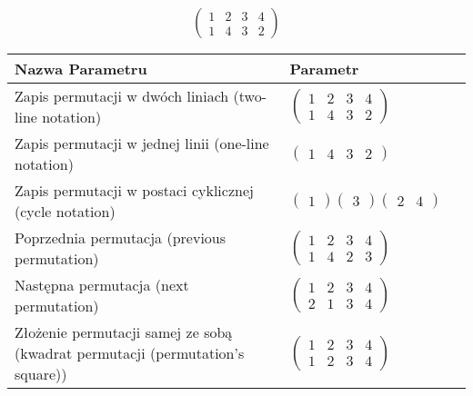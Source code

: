 \documentclass[12pt]{article}
\begin{document}
\subsection{}
\begin{center}
\[
\begin{pmatrix}
	1 & 2 & 3 & 4 \\ 
	1 & 4 & 3 & 2 
\end{pmatrix}
\]

\begin{tabular}{|m{0.6\linewidth}|m{0.4\linewidth}|}
	\hline
	Nazwa Parametru & Parametr \\
	\hline
	Zapis permutacji w dwóch liniach (two-line notation) & $\begin{pmatrix} 1 & 2 & 3 & 4 \\ 
1 & 4 & 3 & 2 \end{pmatrix}$ \\ 
	\hline
	Zapis permutacji w jednej linii (one-line notation) & $\begin{pmatrix} 1 & 4 & 3 & 2 \end{pmatrix}$ \\ 
	\hline
	Zapis permutacji w postaci cyklicznej (cycle notation) & $\begin{pmatrix} 1 \end{pmatrix} \begin{pmatrix} 3 \end{pmatrix} \begin{pmatrix} 2 & 4 \end{pmatrix} $ \\ 
	\hline
	Poprzednia permutacja (previous permutation) & $\begin{pmatrix} 1 & 2 & 3 & 4 \\ 
1 & 4 & 2 & 3 \end{pmatrix}$ \\ 
	\hline
	Następna permutacja (next permutation) & $\begin{pmatrix} 1 & 2 & 3 & 4 \\ 
2 & 1 & 3 & 4 \end{pmatrix}$ \\ 
	\hline
	Złożenie permutacji samej ze sobą (kwadrat permutacji (permutation's square)) & $\begin{pmatrix} 1 & 2 & 3 & 4 \\ 
1 & 2 & 3 & 4 \end{pmatrix}$ \\ 
	\hline
\end{tabular}
\end{center}
\end{document}
